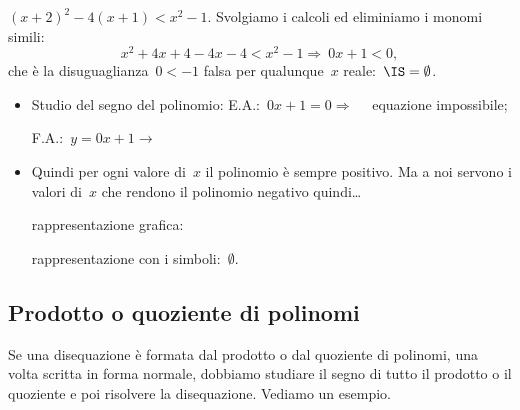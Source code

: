 \begin{exrig}
\begin{esempio}
$(x+2)^2-4(x+1)<x^{2}-1.$
Svolgiamo i calcoli ed eliminiamo i monomi simili:
\[x^{2}+4x+4-4x-4<x^{2}-1\Rightarrow~0 x + 1 < 0,\]
che è la disuguaglianza~$0<-1$ falsa per qualunque~$x$ reale:~$\IS=\emptyset $.
\begin{itemize}
 \item Studio del segno del polinomio:
 \subitem E.A.:~$0 x + 1 = 0  \Rightarrow \quad $ equazione impossibile;
 \subitem
  \begin{minipage}{.25\textwidth}
   F.A.:~$y=0 x + 1 \rightarrow $
  \end{minipage}
  \begin{minipage}{.30\textwidth}
  
  \end{minipage}
 \item Quindi per ogni valore di~$x$ il polinomio è sempre positivo. 
  Ma a noi servono i valori di~$x$ che rendono il polinomio negativo 
  quindi\dots
 \subitem 
  \begin{minipage}{.35\textwidth}
   rappresentazione grafica: 
  \end{minipage}
  \begin{minipage}{.30\textwidth}
   
  \end{minipage}
 \subitem rappresentazione con i simboli:~$\emptyset$. 
\end{itemize}
\end{esempio}
\end{exrig}

\subsection{Prodotto o quoziente di polinomi}
\label{sec:dis_prod_quo}

Se una disequazione è formata dal prodotto o dal quoziente di polinomi, 
una volta scritta in forma normale,
dobbiamo studiare il segno di tutto il prodotto o il quoziente e poi risolvere
la disequazione.
Vediamo un esempio.

